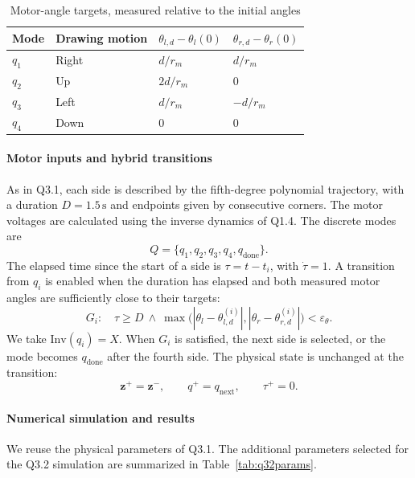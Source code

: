 \documentclass[a4paper,12pt]{article}
\begin{document}
\begin{table}[H]
\centering
\caption{Motor-angle targets, measured relative to the initial angles}
\label{tab:q32_angles}
\begin{tabular}{llll}
\hline
Mode & Drawing motion & $\theta_{l,d}-\theta_l(0)$ & $\theta_{r,d}-\theta_r(0)$ \\
\hline
$q_1$ & Right & $d/r_m$ & $d/r_m$ \\
$q_2$ & Up & $2d/r_m$ & $0$ \\
$q_3$ & Left & $d/r_m$ & $-d/r_m$ \\
$q_4$ & Down & $0$ & $0$ \\
\hline
\end{tabular}
\end{table}

\paragraph{Motor inputs and hybrid transitions}
As in Q3.1, each side is described by the fifth-degree polynomial trajectory, with a duration $D=1.5\,\mathrm{s}$ and endpoints given by consecutive corners. The motor voltages are calculated using the inverse dynamics of Q1.4. The discrete modes are
\[
Q=\{q_1,q_2,q_3,q_4,q_{\mathrm{done}}\}.
\]
The elapsed time since the start of a side is $\tau=t-t_i$, with $\dot\tau=1$. A transition from $q_i$ is enabled when the duration has elapsed and both measured motor angles are sufficiently close to their targets:
\begin{equation}
\boxed{G_i:\quad \tau\ge D\ \land\
\max\bigl(|\theta_l-\theta_{l,d}^{(i)}|,
|\theta_r-\theta_{r,d}^{(i)}|\bigr)<\varepsilon_\theta.}
\end{equation}
We take $\mathrm{Inv}(q_i)=X$. When $G_i$ is satisfied, the next side is selected, or the mode becomes $q_{\mathrm{done}}$ after the fourth side. The physical state is unchanged at the transition:
\begin{equation}
\mathbf z^+=\mathbf z^-,\qquad q^+=q_{\mathrm{next}},\qquad \tau^+=0.
\end{equation}

\paragraph{Numerical simulation and results}
We reuse the physical parameters of Q3.1. The additional parameters selected for the Q3.2 simulation are summarized in Table~\ref{tab:q32params}.
\end{document}
